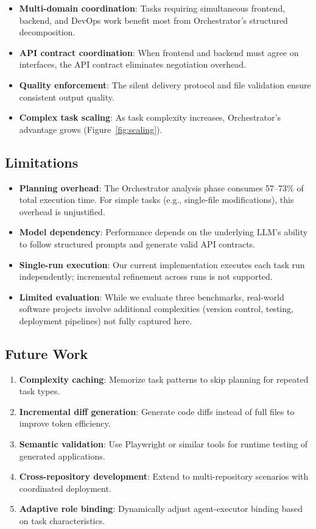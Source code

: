 \documentclass[12pt]{article}
\begin{document}
\begin{itemize}
  \item \textbf{Multi-domain coordination}: Tasks requiring simultaneous frontend, backend, and DevOps work benefit most from Orchestrator's structured decomposition.
  \item \textbf{API contract coordination}: When frontend and backend must agree on interfaces, the API contract eliminates negotiation overhead.
  \item \textbf{Quality enforcement}: The silent delivery protocol and file validation ensure consistent output quality.
  \item \textbf{Complex task scaling}: As task complexity increases, Orchestrator's advantage grows (Figure~\ref{fig:scaling}).
\end{itemize}

\subsection{Limitations}

\begin{itemize}
  \item \textbf{Planning overhead}: The Orchestrator analysis phase consumes 57--73\% of total execution time. For simple tasks (e.g., single-file modifications), this overhead is unjustified.
  \item \textbf{Model dependency}: Performance depends on the underlying LLM's ability to follow structured prompts and generate valid API contracts.
  \item \textbf{Single-run execution}: Our current implementation executes each task run independently; incremental refinement across runs is not supported.
  \item \textbf{Limited evaluation}: While we evaluate three benchmarks, real-world software projects involve additional complexities (version control, testing, deployment pipelines) not fully captured here.
\end{itemize}

\subsection{Future Work}

\begin{enumerate}
  \item \textbf{Complexity caching}: Memorize task patterns to skip planning for repeated task types.
  \item \textbf{Incremental diff generation}: Generate code diffs instead of full files to improve token efficiency.
  \item \textbf{Semantic validation}: Use Playwright or similar tools for runtime testing of generated applications.
  \item \textbf{Cross-repository development}: Extend to multi-repository scenarios with coordinated deployment.
  \item \textbf{Adaptive role binding}: Dynamically adjust agent-executor binding based on task characteristics.
\end{enumerate}
\end{document}
